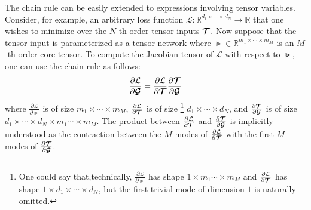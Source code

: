 The chain rule can be easily extended to expressions involving tensor variables. Consider, for example, an arbitrary loss function $\mathcal{ L}: \mathbb{R}^{d_1\times \cdots \times d_N} \to \mathbb{R}$ that one wishes to minimize over the $N$-th order tensor inputs $\bm{\mathcal{T}}$. Now suppose that the tensor input is parameterized as a tensor network where $\Gt \in \mathbb{R}^{m_1\times \cdots \times m_M}$ is an $M$-th order core tensor. To compute the Jacobian tensor of $\mathcal L$ with respect to $\Gt$, one can use the chain rule as follows: 
$$\frac{\partial  \mathcal L}{\partial\bm{\mathcal{G}}} 
=
\frac{\partial \mathcal L}{\partial \bm{\mathcal{T}} }\frac{\partial\bm{\mathcal{T}}}{\partial\bm{\mathcal{G}}}  $$
where $\frac{\partial  \mathcal L}{\partial\Gt}$ is of size $m_1\times\cdots \times m_M$, $\frac{\partial  \mathcal L}{\partial \bm{\mathcal{T}} }$ is of size%
\footnote{One could say that,technically, $\frac{\partial  \mathcal L}{\partial\Gt}$ has shape $1\times m_1 \cdots \times m_M$  and $\frac{\partial  \mathcal L}{\partial \bm{\mathcal{T}} }$ has shape $1\times d_1\times \cdots \times d_N$, but the first trivial mode of dimension $1$ is naturally omitted.}
$d_1\times \cdots \times d_N$, and $\frac{\partial\bm{\mathcal{T}}}{\partial\bm{\mathcal{G}}} $ is of size $d_1\times \cdots \times d_N \times m_1 \cdots \times m_M$. The product between $\frac{\partial  \mathcal L}{\partial \bm{\mathcal{T}} }$ and $\frac{\partial\bm{\mathcal{T}}}{\partial\bm{\mathcal{G}}}  $ is implicitly understood as the contraction between the $M$ modes of $\frac{\partial  \mathcal L}{\partial \bm{\mathcal{T}} }$ with the first $M$-modes  of $\frac{\partial\bm{\mathcal{T}}}{\partial\bm{\mathcal{G}}}  $.

